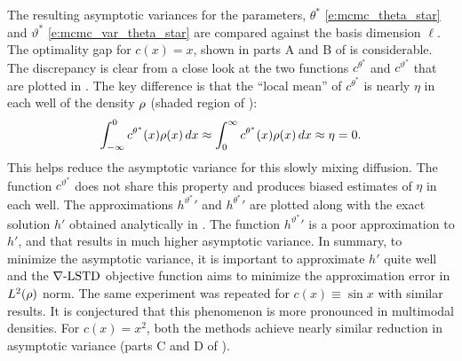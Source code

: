 The resulting asymptotic variances for the parameters, $\theta^*$ \eqref{e:mcmc_theta_star} and $\vartheta^*$ \eqref{e:mcmc_var_theta_star} are compared against the basis dimension $\ell$.  The optimality gap for $c(x) = x$, shown in parts A and B of  is considerable.
The discrepancy is clear from a close look at the two functions $c^{\theta^*}$ and $c^{\vartheta^*}$ that are plotted in . The key difference is that the ``local mean'' of $c^{\theta^*}$ is nearly $\eta$ in each well of the density $\rho$ (shaded region of ):
\[
\begin{aligned}
\int_{-\infty}^0 c^{\theta^*}(x) \rho(x)\, dx	
\approx
\int_0^\infty c^{\theta^*}(x) \rho(x) \, dx \approx \eta =0.
\end{aligned}
\]
This helps reduce the asymptotic variance for this slowly mixing diffusion. The function $c^{\vartheta^*}$  does not share this property and produces biased estimates of $\eta$ in each well.
The approximations ${h^{\vartheta^*}}'$ and ${h^{\theta^*}}'$ are plotted along with the exact solution $h'$ obtained analytically in
.  The function ${h^{\vartheta^*}}'$ is a poor approximation to $h'$,  and that results in much higher asymptotic variance. In summary, to minimize the asymptotic variance, it is  important to approximate $h'$ quite well and the $\nabla\text{-LSTD}$ objective function aims to minimize the approximation error in $L^2(\rho)$ norm. The same experiment was repeated for $c(x) \equiv\sin x$ with similar results. It is conjectured that this phenomenon is more pronounced in multimodal densities. For $c(x) = x^2$, both the methods achieve nearly similar reduction in asymptotic variance (parts C and D of ). 


